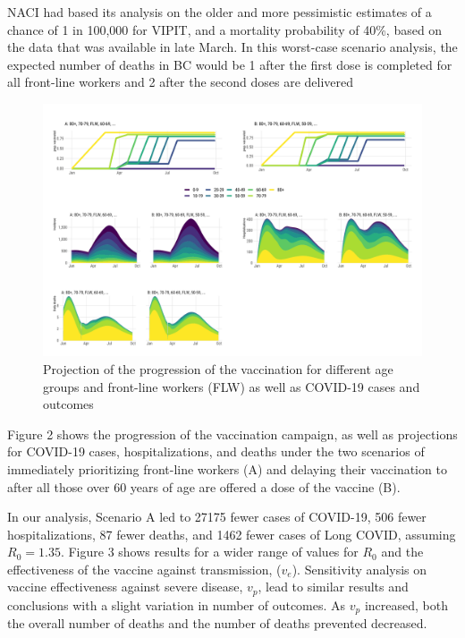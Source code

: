 \documentclass[]{interact}
\theoremstyle{plain}%
\theoremstyle{definition}
\theoremstyle{remark}
\begin{document}
NACI had based its analysis on the older and more pessimistic estimates
of a chance of 1 in 100,000 for VIPIT, and a mortality probability of
40\%, based on the data that was available in late March. In this
worst-case scenario analysis, the expected number of deaths in BC would
be 1 after the first dose is completed for all front-line workers and 2
after the second doses are delivered

\begin{figure}

{\centering \includegraphics[width=1\linewidth]{../figures/fig-trajectoriesFull} 

}

\caption{Projection of the progression of the vaccination for different age groups and front-line workers (FLW) as well as COVID-19 cases and outcomes}\label{fig:fig1}
\end{figure}

Figure 2 shows the progression of the vaccination campaign, as well as
projections for COVID-19 cases, hospitalizations, and deaths under the
two scenarios of immediately prioritizing front-line workers (A) and
delaying their vaccination to after all those over 60 years of age are
offered a dose of the vaccine (B).

In our analysis, Scenario A led to 27175 fewer cases of COVID-19, 506
fewer hospitalizations, 87 fewer deaths, and 1462 fewer cases of Long
COVID, assuming \(R_0=1.35\). Figure 3 shows results for a wider range
of values for \(R_0\) and the effectiveness of the vaccine against
transmission, (\(v_e\)). Sensitivity analysis on vaccine effectiveness
against severe disease, \(v_p\), lead to similar results and conclusions
with a slight variation in number of outcomes. As \(v_p\) increased,
both the overall number of deaths and the number of deaths prevented
decreased.
\end{document}
